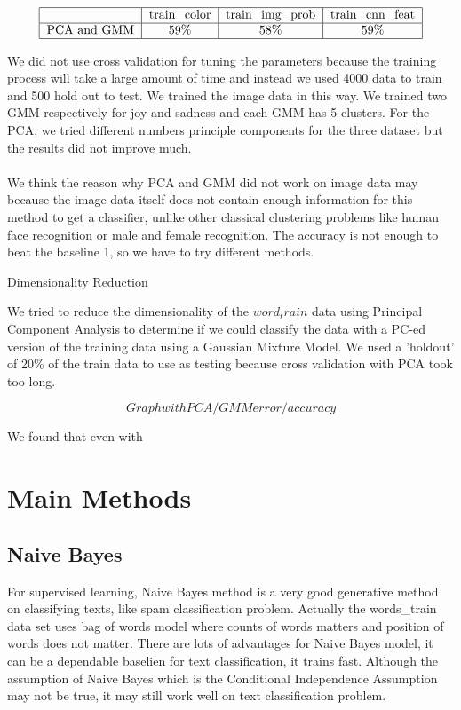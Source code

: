 \documentclass[]{article}
\begin{document}
\[
\begin{tabular}{|c|c|c|c|}
\hline &train\_color & train\_img\_prob & train\_cnn\_feat\\
\hline PCA and GMM&59\%&58\%&59\%\\
\hline
\end{tabular}
\]

We did not use cross validation for tuning the parameters because the training process will take a large amount of time and instead we used 4000 data to train and 500 hold out to test. We trained the image data in this way. We trained two GMM respectively for joy and sadness and each GMM has 5 clusters. For the PCA, we tried different numbers principle components for the three dataset but the results did not improve much.\\\\

We think the reason why PCA and GMM did not work on image data may because the image data itself does not contain enough information for this method to get a classifier, unlike other classical clustering problems like human face recognition or male and female recognition. The accuracy is not enough to beat the baseline 1, so we have to try different methods.

Dimensionality Reduction

We tried to reduce the dimensionality of the $word_train$ data using Principal Component Analysis to determine if we could classify the data with a PC-ed version of the training data using a Gaussian Mixture Model. We used a 'holdout' of 20\% of the train data to use as testing because cross validation with PCA took too long.  

$$Graph with PCA/GMM error/accuracy$$

We found that even with 


\section{Main Methods}

\subsection{Naive Bayes}

For supervised learning, Naive Bayes method is a very good generative method on classifying texts, like spam classification problem. Actually the words\_train data set uses bag of words model where counts of words matters and position of words does not matter. There are lots of advantages for Naive Bayes model, it can be a dependable baselien for text classification, it trains fast. Although the assumption of Naive Bayes which is the Conditional Independence Assumption may not be true, it may still work well on text classification problem.\\\\
\end{document}
